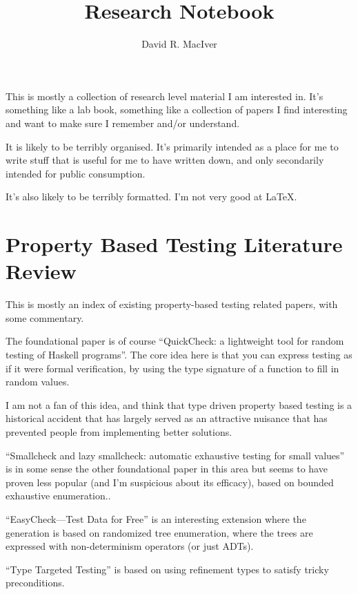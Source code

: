 \documentclass[a4paper]{book}
\title{Research Notebook}
\author{David R. MacIver}
\begin{document}
\maketitle

This is mostly a collection of research level material I am interested in.
It's something like a lab book,
something like a collection of papers I find interesting and want to make sure I remember and/or understand.

It is likely to be terribly organised.
It's primarily intended as a place for me to write stuff that is useful for me to have written down,
and only secondarily intended for public consumption.

It's also likely to be terribly formatted.
I'm not very good at \LaTeX.

\tableofcontents

\chapter{Property Based Testing Literature Review}

This is mostly an index of existing property-based testing related papers,
with some commentary.

The foundational paper is of course ``QuickCheck: a lightweight tool for random testing of Haskell programs''\cite{DBLP:conf/icfp/ClaessenH00}.
The core idea here is that you can express testing as if it were formal verification,
by using the type signature of a function to fill in random values.

I am not a fan of this idea,
and think that type driven property based testing is a historical accident that has largely served as an attractive nuisance that has prevented people from implementing better solutions.

``Smallcheck and lazy smallcheck: automatic exhaustive testing for small values''\cite{DBLP:conf/haskell/RuncimanNL08} is in some sense the other foundational paper in this area
but seems to have proven less popular (and I'm suspicious about its efficacy),
based on bounded exhaustive enumeration..

``EasyCheck---Test Data for Free''\cite{DBLP:conf/flops/ChristiansenF08} is an interesting extension where the generation is based on randomized tree enumeration,
where the trees are expressed with non-determinism operators (or just ADTs).

``Type Targeted Testing''\cite{DBLP:conf/esop/SeidelVJ15} is based on using refinement types to satisfy tricky preconditions.
\end{document}

